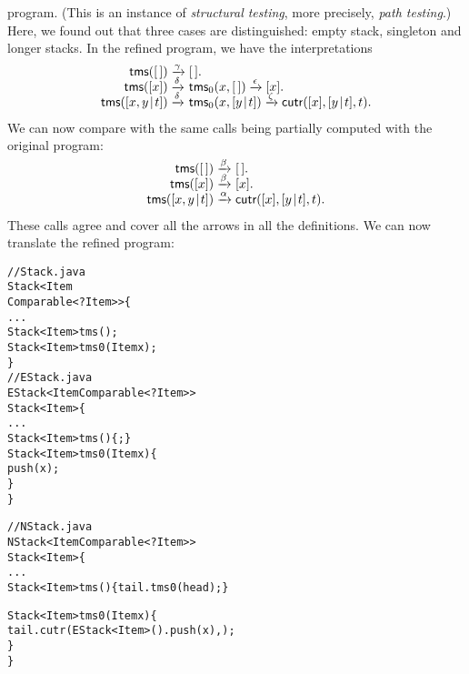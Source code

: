 program. (This is an instance of \emph{structural
  testing}, more precisely,
\emph{path testing}.) Here, we found out
that three cases are distinguished: empty stack, singleton and longer
stacks. In the refined program, we have the interpretations
\begin{equation*}
\begin{array}{@{}r@{\;}l@{\;}l@{}}
\fun{tms}(\el) & \xrightarrow{\smash{\gamma}} & \el.\\
\fun{tms}([x]) & \xrightarrow{\smash{\delta}} & \fun{tms}_0(x,\el)
                 \xrightarrow{\smash{\epsilon}} [x].\\
\fun{tms}(\cons{x,y}{t})
  & \xrightarrow{\smash{\delta}} & \fun{tms}_0(x,\cons{y}{t})
    \xrightarrow{\smash{\zeta}} \fun{cutr}([x],\cons{y}{t},t).
\end{array}
\end{equation*}
We can now compare with the same calls being partially computed with
the original program:
\begin{equation*}
\begin{array}{@{}r@{\;}l@{\;}l@{}}
\fun{tms}(\el) & \xrightarrow{\smash{\beta}} & \el.\\
\fun{tms}([x]) & \xrightarrow{\smash{\beta}} & [x].\\
\fun{tms}(\cons{x,y}{t}) & \xrightarrow{\smash{\alpha}}
                         & \fun{cutr}([x],\cons{y}{t},t).
\end{array}
\end{equation*}
These calls agree and cover all the arrows in all the definitions. We
can now translate the refined program:
\begin{alltt}
// Stack.java
\public \abstractX \class Stack<Item
\hfill\extends Comparable<? \super Item>> \{
  ...
  \public \abstractX Stack<Item> tms();
  \protectedX \abstractX Stack<Item> tms0(\final Item x);
\}
// EStack.java
\public \class EStack<Item \extends Comparable<? \super Item>> 
       \extends Stack<Item> \{
  ...
  \public Stack<Item> tms() \{ \return \this; \}
  \protectedX Stack<Item> tms0(\final Item x) \{
    \return push(x);
  \}
\}

// NStack.java
\public \class NStack<Item \extends Comparable<? \super Item>>
       \extends Stack<Item> \{
  ...
  \public Stack<Item> tms() \{ \return tail.tms0(head); \}

  \protectedX Stack<Item> tms0(\final Item x) \{
    \return tail.cutr(\new EStack<Item>().push(x),\this);
  \}
\}
\end{alltt}
